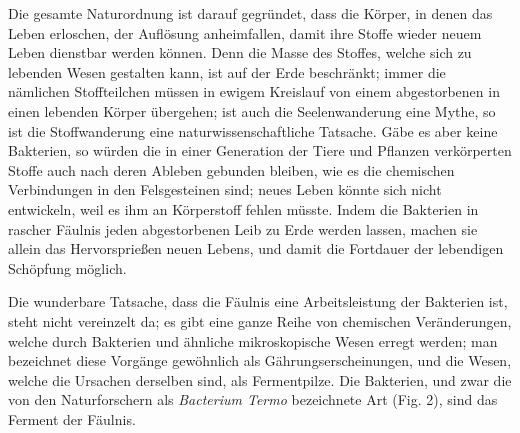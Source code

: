 \documentclass[a4paper, 11pt, oneside, english]{article}
\begin{document}
Die gesamte Naturordnung ist darauf gegründet, dass die Körper, in denen das Leben erloschen, der Auflösung anheimfallen, damit ihre Stoffe wieder neuem Leben dienstbar werden können. Denn die Masse des Stoffes, welche sich zu lebenden Wesen gestalten kann, ist auf der Erde beschränkt; immer die nämlichen Stoffteilchen müssen in ewigem Kreislauf von einem abgestorbenen in einen lebenden Körper übergehen; ist auch die Seelenwanderung eine Mythe, so ist die Stoffwanderung eine naturwissenschaftliche Tatsache. Gäbe es aber keine Bakterien, so würden die in einer Generation der Tiere und Pflanzen verkörperten Stoffe auch nach deren Ableben gebunden bleiben, wie es die chemischen Verbindungen in den Felsgesteinen sind; neues Leben könnte sich nicht entwickeln, weil es ihm an Körperstoff fehlen müsste. Indem die Bakterien in rascher Fäulnis jeden abgestorbenen Leib zu Erde werden lassen, machen sie allein das Hervorsprießen neuen Lebens, und damit die Fortdauer der lebendigen Schöpfung möglich.

Die wunderbare Tatsache, dass die Fäulnis eine Arbeitsleistung der Bakterien ist, steht nicht vereinzelt da; es gibt eine ganze Reihe von chemischen Veränderungen, welche durch Bakterien und ähnliche mikroskopische Wesen erregt werden; man bezeichnet diese Vorgänge gewöhnlich als Gährungserscheinungen, und die Wesen, welche die Ursachen derselben sind, als Fermentpilze. Die Bakterien, und zwar die von den Naturforschern als \emph{Bacterium Termo} bezeichnete Art (Fig. 2), sind das Ferment der Fäulnis.
\end{document}
